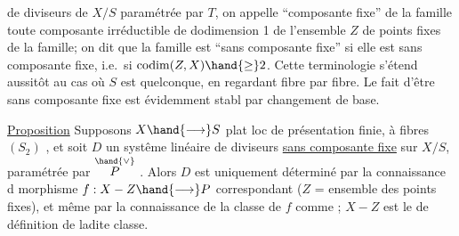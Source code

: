 
de diviseurs de $X/S$ paramétrée par $T$, on appelle ``composante fixe'' de la
famille toute composante irréductible de dodimension 1 de l'ensemble $Z$ de
points fixes de la famille; on dit que la famille est ``sans composante
fixe'' si elle est sans composante fixe, i.e.\ si $\operatorname{codim}(Z,X) \hand{\geq} 2$. Cette
terminologie s'étend aussitôt au cas où $S$ est quelconque, en regardant
fibre par fibre. Le fait d'être sans composante fixe est évidemment stabl
par changement de base.

\uline{Proposition} \hand{/}Supposons $X \hand{\longrightarrow} S$ plat loc de présentation finie, à fibres
$(S_2)$ , et soit $D$ un systême linéaire de diviseurs \uline{sans composante fixe}
sur $X/S$, paramétrée par $\overset{\hand{\vee}}{P}$ . Alors $D$ est uniquement déterminé par la
connaissance d morphisme $f: X - Z \hand{\longrightarrow} P$ correspondant ($Z$ = ensemble
des points fixes), et même par la connaissance de la classe de $f$ comme
  ; $X-Z$ est le 
de définition de ladite classe.

